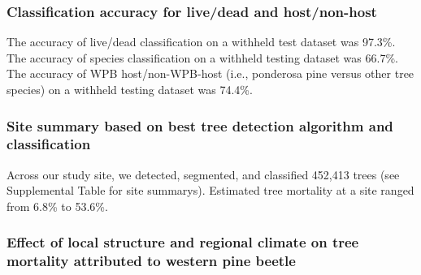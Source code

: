 \documentclass[]{article}
\begin{document}
\hypertarget{classification-accuracy-for-livedead-and-hostnon-host}{%
\subsubsection{Classification accuracy for live/dead and
host/non-host}\label{classification-accuracy-for-livedead-and-hostnon-host}}

The accuracy of live/dead classification on a withheld test dataset was
97.3\%. The accuracy of species classification on a withheld testing
dataset was 66.7\%. The accuracy of WPB host/non-WPB-host (i.e.,
ponderosa pine versus other tree species) on a withheld testing dataset
was 74.4\%.

\hypertarget{site-summary-based-on-best-tree-detection-algorithm-and-classification}{%
\subsubsection{Site summary based on best tree detection algorithm and
classification}\label{site-summary-based-on-best-tree-detection-algorithm-and-classification}}

Across our study site, we detected, segmented, and classified 452,413
trees (see Supplemental Table for site summarys). Estimated tree
mortality at a site ranged from 6.8\% to 53.6\%.

\hypertarget{effect-of-local-structure-and-regional-climate-on-tree-mortality-attributed-to-western-pine-beetle}{%
\subsubsection{Effect of local structure and regional climate on tree
mortality attributed to western pine
beetle}\label{effect-of-local-structure-and-regional-climate-on-tree-mortality-attributed-to-western-pine-beetle}}
\end{document}

